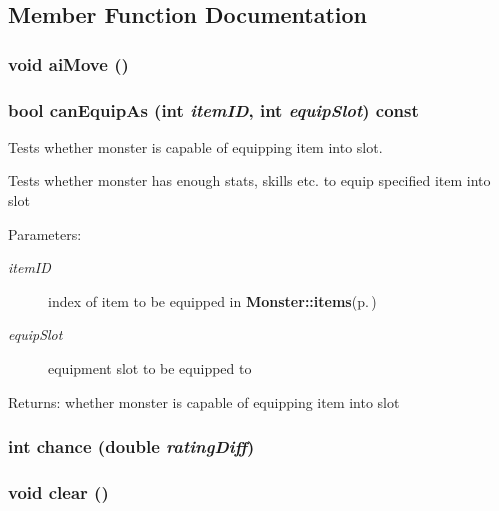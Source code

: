 \subsection{Member Function Documentation}
\subsubsection{\setlength{\rightskip}{0pt plus 5cm}void ai\-Move ()}\label{classMonster_a34}


\subsubsection{\setlength{\rightskip}{0pt plus 5cm}bool can\-Equip\-As (int {\em item\-ID}, int {\em equip\-Slot}) const}\label{classMonster_a18}


Tests whether monster is capable of equipping item into slot. 

Tests whether monster has enough stats, skills etc. to equip specified item into slot

\begin{Desc}
\item[Parameters:]
\begin{description}
\item[{\em item\-ID}]index of item to be equipped in {\bf Monster::items}{\rm (p.\,\pageref{classMonster_o1})}\item[{\em equip\-Slot}]equipment slot to be equipped to\end{description}
\end{Desc}
\begin{Desc}
\item[Returns:]whether monster is capable of equipping item into slot\end{Desc}
\subsubsection{\setlength{\rightskip}{0pt plus 5cm}int chance (double {\em rating\-Diff})}\label{classMonster_a13}


\subsubsection{\setlength{\rightskip}{0pt plus 5cm}void clear ()}\label{classMonster_a2}


